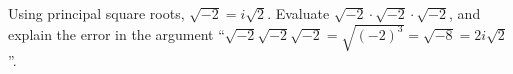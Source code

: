 Using principal square roots, $\sqrt{-2}=i\sqrt2$. Evaluate $\sqrt{-2}\cdot\sqrt{-2}\cdot\sqrt{-2}$, and explain the error in the argument ``$\sqrt{-2}\sqrt{-2}\sqrt{-2}=\sqrt{(-2)^3}=\sqrt{-8}=2i\sqrt2$''.
